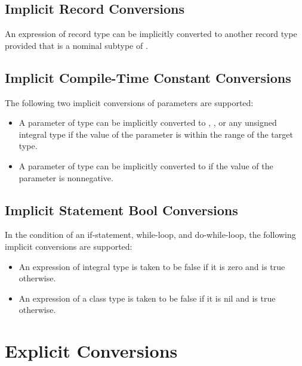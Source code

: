 \subsection{Implicit Record Conversions}
\label{Implicit_Record_Conversions}

An expression of record type  can be implicitly converted to
another record type  provided that  is a nominal
subtype of .

\subsection{Implicit Compile-Time Constant Conversions}
\label{Implicit_Compile_Time_Constant_Conversions}

The following two implicit conversions of parameters are supported:
\begin{itemize}
\item A parameter of type  can be implicitly converted
to , , or any unsigned integral type if the
value of the parameter is within the range of the target type.
\item A parameter of type  can be implicitly converted
to  if the value of the parameter is nonnegative.
\end{itemize}

\subsection{Implicit Statement Bool Conversions}
\label{Implicit_Statement_Bool_Conversions}

In the condition of an if-statement, while-loop, and do-while-loop,
the following implicit conversions are supported:
\begin{itemize}
\item An expression of integral type is taken to be false if it is zero and is true otherwise.
\item An expression of a class type is taken to be false if it is nil and is true otherwise.
\end{itemize}

\section{Explicit Conversions}
\label{Explicit_Conversions}

